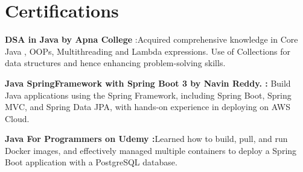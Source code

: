 \section{Certifications}

 \resumeItemListStart    
 \item {
   {\textbf{ DSA in Java by Apna College} :}{Acquired comprehensive knowledge in Core Java , OOPs, Multithreading and Lambda expressions. Use of Collections for  data structures and hence enhancing problem-solving skills.}}
   
  \item { {\textbf{Java SpringFramework with Spring Boot 3 by Navin Reddy. :}} {Build  Java applications using the Spring Framework, including Spring Boot, Spring MVC, and Spring Data JPA, with hands-on experience in deploying on AWS Cloud. }}
  
   \item {
   {\textbf{Java For Programmers on Udemy :}}{Learned how to build, pull, and run Docker images, and effectively managed multiple containers to deploy a Spring Boot application with a PostgreSQL database.}  }
 
 
        
    \resumeItemListEnd

    



    
